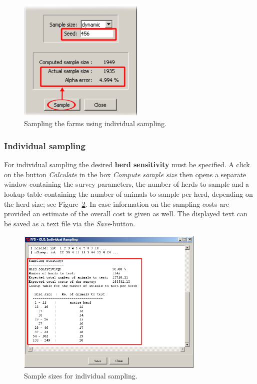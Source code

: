 \documentclass[nojss]{jss}
\begin{document}
\begin{figure}[h!t]
\begin{center}
\includegraphics[width=60mm]{GUI_sample_ltd2.png}
\end{center}
\caption{Sampling the farms using individual sampling.} \label{fig:GUI_sample_ltd2}
\end{figure}


\subsubsection{Individual sampling}

For individual sampling the desired \textbf{herd sensitivity} must be specified. A click on the button \emph{Calculate} in the box \emph{Compute sample size} then opens a separate window containing the survey parameters, the number of herds to sample and a lookup table containing the number of animals to sample per herd, depending on the herd size; see Figure~\ref{fig:GUI_calc_ind2}. In case information on the sampling costs are provided an estimate of the overall cost is given as well. The displayed text can be saved as a text file via the \emph{Save}-button.

\begin{figure}[h!t]
\begin{center}
\includegraphics[width=90mm]{GUI_calc_ind2.png}
\end{center} \caption{Sample sizes for individual sampling.} \label{fig:GUI_calc_ind2}
\end{figure}
\end{document}
